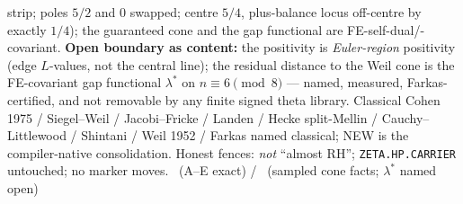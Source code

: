 strip; poles $5/2$ and $0$ swapped; centre $5/4$, plus-balance locus off-centre by
exactly $1/4$); the guaranteed cone and the gap functional are
FE-self-dual/-covariant.
\textbf{Open boundary as content:} the positivity is \emph{Euler-region} positivity
(edge $L$-values, not the central line); the residual distance to the Weil cone is
the FE-covariant gap functional $\lambda^*$ on $n\equiv6\pmod 8$ --- named,
measured, Farkas-certified, and not removable by any finite signed theta library.
Classical Cohen 1975 / Siegel--Weil / Jacobi--Fricke / Landen / Hecke split-Mellin /
Cauchy--Littlewood / Shintani / Weil 1952 / Farkas named classical; NEW is the
compiler-native consolidation.
Honest fences: \emph{not} ``almost RH''; \texttt{ZETA.HP.CARRIER} untouched;
no marker moves.
\mE\ (A--E exact) / \mC\ (sampled cone facts; $\lambda^*$ named open)


